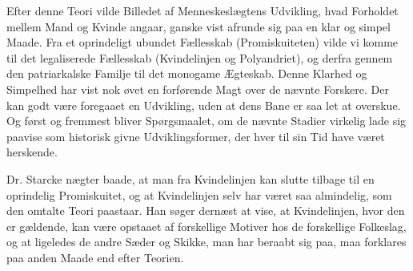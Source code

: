 \documentclass[12pt,a4paper,openany]{book}
\newcommand{\opage}[1]{\marginnote{\footnotesize\textit{[#1]}}}
\begin{document}
Efter denne Teori vilde Billedet af Menneskeslægtens Udvikling,
hvad Forholdet mellem Mand og Kvinde angaar, ganske
vist afrunde sig paa en klar og simpel Maade. Fra et oprindeligt
ubundet Fællesskab (Promiskuiteten) vilde vi komme til det legaliserede
Fællesskab (Kvindelinjen og Polyandriet), og derfra gennem
den patriarkalske Familje til det monogame Ægteskab. Denne
Klarhed og Simpelhed har vist nok øvet en forførende Magt over
de nævnte Forskere. Der kan godt være foregaaet en Udvikling,
uden at dens Bane er saa let at overskue. Og først og fremmest
bliver Spørgsmaalet, om de nævnte Stadier virkelig lade sig paavise
som historisk givne Udviklingsformer, der hver til sin Tid
have været herskende.

\opage{790}Dr. Starcke nægter baade, at man fra Kvindelinjen kan
slutte tilbage til en oprindelig Promiskuitet, og at Kvindelinjen
selv har været saa almindelig, som den omtalte Teori paastaar.
Han søger dernæst at vise, at Kvindelinjen, hvor den er gældende,
kan være opstaaet af forskellige Motiver hos de forskellige Folkeslag,
og at ligeledes de andre Sæder og Skikke, man har beraabt
sig paa, maa forklares paa anden Maade end efter Teorien.
\end{document}
